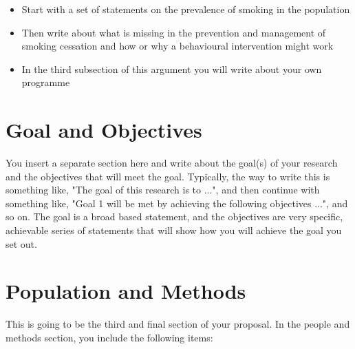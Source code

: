 \documentclass[a4paper]{article}
\begin{document}
\begin{itemize}
\item Start with a set of statements on the prevalence of smoking in the population
\item Then write about what is missing in the prevention and management of smoking cessation and how or why a behavioural intervention might work
\item In the third subsection of this argument you will write about your own programme
\end{itemize}

\section*{Goal and Objectives}

You insert a separate section here and write about the goal(s) of your research and the objectives that will meet the goal. Typically, the way to write this is something like, "The goal of this research is to ...", and then continue with something like, "Goal 1 will be met by achieving the following objectives ...", and so on. The goal is a broad based statement, and the objectives are very specific, achievable series of statements that will show how you will achieve the goal you set out. 

\section*{Population and Methods}

This is going to be the third and final section of your proposal. In the people and methods section, you include the following items:
\end{document}

